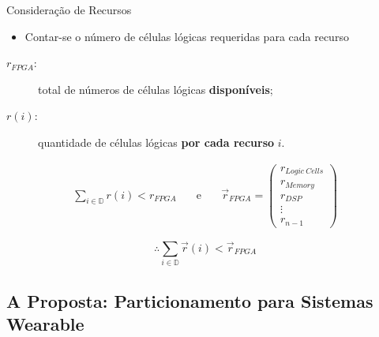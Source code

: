       \begin{frame}{Consideração de Recursos}
         \begin{itemize}
            \item Contar-se o número de células lógicas requeridas para cada recurso
         \end{itemize}
         \begin{description}
            \item [$ r_{FPGA} $:] total de números de células lógicas \textbf{disponíveis};
            
            \item [$ r(i) $:] quantidade de células lógicas \textbf{por cada recurso} $ i $.
         \end{description}
            
            \begin{eqnarray}
            \sum_{i \in \mathbb{D}} r(i) < r_{FPGA} & \quad \text{e} \quad & 
            \vec{r}_{FPGA} =
            \begin{pmatrix}
            r_{Logic\ Cells} \\
            r_{Memory}\\
            r_{DSP}\\
            \vdots \\
            r_{n-1}
            \end{pmatrix}
            \end{eqnarray}
            
            \begin{equation}
            \therefore \sum_{i \in \mathbb{D}} \vec{r}(i) < \vec{r}_{FPGA}
            \end{equation}
            
      \end{frame}
      
      
   \subsection{A Proposta: Particionamento para Sistemas Wearable}

